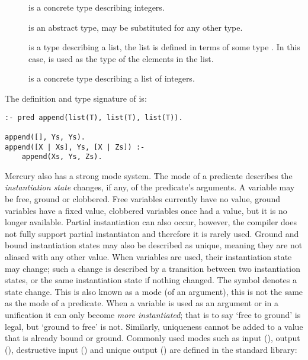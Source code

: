 \begin{description}

    \item[] is a concrete type describing integers.

    \item[] is an abstract type,  may be substituted for any other
    type.

    \item[] is a type describing a list, the list is defined
    in terms of some type .
    In this case,  is used as the type of the elements in the list.

    \item[] is a concrete type describing a list of
    integers.

\end{description}

\noindent
The definition and type signature of  is:

\begin{verbatim}
:- pred append(list(T), list(T), list(T)).

append([], Ys, Ys).
append([X | Xs], Ys, [X | Zs]) :-
    append(Xs, Ys, Zs).
\end{verbatim}

\noindent
Mercury also has a strong mode system.
The mode of a predicate describes the \emph{instantiation state} changes,
if any, of the predicate's arguments.
A variable may be free, ground or clobbered.
Free variables currently have no value,
ground variables have a fixed value,
clobbered variables once had a value, but it is no longer available.
Partial instantiation can also occur,
however, the compiler does not fully support partial instantiaton
and therefore it is rarely used.
Ground and bound instantiation states may also be described as unique,
meaning they are not aliased with any other value.
When variables are used, their instantiation state may change;
such a change is described by a transition between two instantiation states,
or the same instantiation state if nothing changed.
The symbol \code{>>} denotes a state change.
This is also known as a mode (of an argument),
this is not the same as the mode of a predicate.
When a variable is used as an argument or in a unification it can only
become \emph{more instantiated};
that is to say `free to ground' is legal, but `ground to free' is not.
Similarly, uniqueness cannot be added to a value that is already
bound or ground.
Commonly used modes such as input (), output (),
destructive input () and unique output () are
defined in the standard library:

